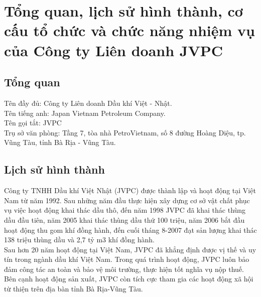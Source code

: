 \documentclass[12pt,a4paper]{report}
\begin{document}
\section{Tổng quan, lịch sử hình thành, cơ cấu tổ chức và chức năng nhiệm vụ của Công ty Liên doanh JVPC}
\subsection{Tổng quan}
Tên đầy đủ: Công ty Liên doanh Dầu khí Việt - Nhật.\\
Tên tiếng anh: Japan Vietnam Petroleum Company.\\
Tên gọi tắt: JVPC\\
Trụ sở văn phòng: Tầng 7, tòa nhà PetroVietnam, số 8 đường Hoàng Diệu, tp. Vũng Tàu, tỉnh Bà Rịa - Vũng Tàu.

\subsection{Lịch sử hình thành}
Công ty TNHH Dầu khí Việt Nhật (JVPC) được thành lập và hoạt động tại Việt Nam từ năm 1992. Sau những năm đầu thực hiện xây dựng cơ sở vật chất phục vụ việc hoạt động khai thác dầu thô, đến năm 1998 JVPC đã khai thác thùng dầu đầu tiên, năm 2005 khai thác thùng dầu thứ 100 triệu, năm 2006 bắt đầu hoạt động thu gom khí đồng hành, đến cuối tháng 8-2007 đạt sản lượng khai thác 138 triệu thùng dầu và 2,7 tỷ m3 khí đồng hành.\\
Sau hơn 20 năm hoạt động tại Việt Nam, JVPC đã khẳng định được vị thế và uy tín trong ngành dầu khí Việt Nam. Trong quá trình hoạt động, JVPC luôn bảo đảm công tác an toàn và bảo vệ môi trường, thực hiện tốt nghĩa vụ nộp thuế. Bên cạnh hoạt động sản xuất, JVPC còn tích cực tham gia các hoạt động xã hội từ thiện trên địa bàn tỉnh Bà Rịa-Vũng Tàu.
\end{document}

